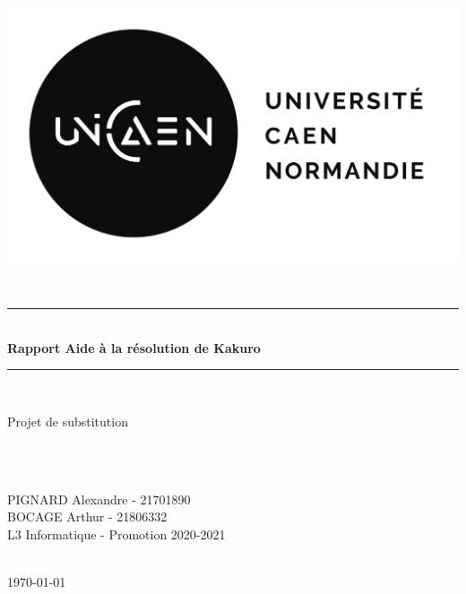 \documentclass[12pt]{article}
\begin{document}
\begin{titlepage}
\newcommand{\HRule}{\rule{\linewidth}{0.5mm}}
\setlength{\topmargin}{0in}
\begin{minipage}{0.4\textwidth}
	\begin{flushleft} \large
		\hspace*{-0.5cm}
		\includegraphics[scale=0.20]{./ressources/logo-unicaen.jpg}
	\end{flushleft}
\end{minipage}
\center
\textsc{\large }\\[0.5cm]
\HRule \\[0.4cm]
{ \huge \bfseries Rapport Aide à la résolution de Kakuro}\\[0.4cm]
\HRule \\[1cm]
\begin{minipage}{\textwidth}
	\begin{flushright} \huge
		\center
		Projet de substitution
	\end{flushright}
\end{minipage}\\[1cm]
\textsc{\large }\\[1cm]
\begin{minipage}{\textwidth}
	\begin{flushright} \large
		\center
		PIGNARD Alexandre - 21701890\\BOCAGE Arthur - 21806332
		\\[1cm]
		L3 Informatique - Promotion 2020-2021
	\end{flushright}
\end{minipage}
\textsc{\large }\\[2cm]
{\large \today}\\[0.5cm]
\vfill
\end{titlepage}

\thispagestyle{empty}
\setcounter{page}{0}
\newpage
\end{document}
